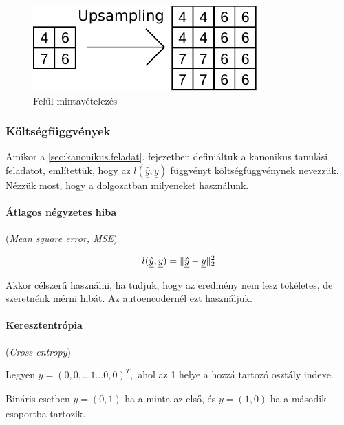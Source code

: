 \begin{figure} [h!]
	\centering
	\includegraphics[scale=1.2]{img/upsamping-pelda.pdf}
	\caption{Felül-mintavételezés}
	\label{fig:upsampling-pelda}
\end{figure}




\subsubsection{Költségfüggvények}

Amikor a \ref{sec:kanonikus.feladat}. fejezetben definiáltuk a kanonikus tanulási feladatot, említettük, hogy az $ l(\underline{\hat{y}}, \underline{y}) $ függvényt költségfüggvénynek nevezzük. Nézzük most, hogy a dolgozatban milyeneket használunk.

%


\paragraph{Átlagos négyzetes hiba} (\textit{Mean square error, MSE})


\[  l(\underline{\hat{y}}, \underline{y}) = \lVert\underline{\hat{y}} - \underline{y}\rVert_2^2  \]

\noindent
Akkor célszerű használni, ha tudjuk, hogy az eredmény nem lesz tökéletes, de szeretnénk mérni hibát. Az autoencodernél ezt használjuk.


\paragraph{Keresztentrópia} (\textit{Cross-entropy})

Legyen $ \underline{y} = (0, 0, \dots 1 \dots 0, 0)^T, $ 
ahol az 1 helye a hozzá tartozó osztály indexe.

Bináris esetben $ \underline{y}=(0, 1) $ ha a minta az első, és
$ \underline{y}=(1, 0) $ ha a második csoportba tartozik.

